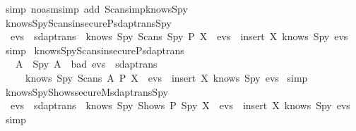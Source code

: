 \begin{isabellebody}
  \isatagproof
  \isamarkupfalse%
  \ {\isacharparenleft}simp\ {\isacharparenleft}no{\isacharunderscore}asm{\isacharunderscore}simp{\isacharparenright}\ add{\isacharcolon}\ Scans{\isacharunderscore}imp{\isacharunderscore}knows{\isacharunderscore}Spy{\isacharparenright}\isanewline
  \isamarkupfalse%
  \endisatagproof
  {\isafoldproof}%
  \isadelimproof
  \isanewline
  \endisadelimproof
  \isanewline
  \isamarkupfalse%
  \ knows{\isacharunderscore}Spy{\isacharunderscore}Scans{\isacharunderscore}insecureP{\isacharunderscore}sdaptrans{\isacharunderscore}Spy\ {\isacharcolon}\isanewline
  \ \ {\isachardoublequoteopen}evs\ {\isasymin}\ sdaptrans\ {\isasymLongrightarrow}\ knows\ Spy\ {\isacharparenleft}Scans\ Spy\ P\ X\ {\isacharhash}\ evs{\isacharparenright}\ {\isacharequal}\ insert\ X\ {\isacharparenleft}knows\ Spy\ evs{\isacharparenright}{\isachardoublequoteclose}\isanewline
  \isadelimproof
  \endisadelimproof
  \isatagproof
  \isamarkupfalse%
  \ simp%
  \endisatagproof
  {\isafoldproof}%
  \isadelimproof
  \isanewline
  \endisadelimproof
  \isanewline
  \isamarkupfalse%
  \ knows{\isacharunderscore}Spy{\isacharunderscore}Scans{\isacharunderscore}insecureP{\isacharunderscore}sdaptrans\ {\isacharcolon}\isanewline
  \ \ {\isachardoublequoteopen}{\isasymlbrakk}\ A\ {\isasymnoteq}\ Spy{\isacharsemicolon}\ A\ {\isasymin}\ bad{\isacharsemicolon}\ evs\ {\isasymin}\ sdaptrans\ {\isasymrbrakk}\ \isanewline
  \ \ \ \ {\isasymLongrightarrow}\ knows\ Spy\ {\isacharparenleft}Scans\ A\ P\ X\ {\isacharhash}\ evs{\isacharparenright}\ {\isacharequal}\ insert\ X\ {\isacharparenleft}knows\ Spy\ evs{\isacharparenright}{\isachardoublequoteclose}\isanewline
  \isadelimproof
  \endisadelimproof
  \isatagproof
  \isamarkupfalse%
  \ simp%
  \endisatagproof
  {\isafoldproof}%
  \isadelimproof
  \isanewline
  \endisadelimproof
  \isanewline
  \isamarkupfalse%
  \ knows{\isacharunderscore}Spy{\isacharunderscore}Shows{\isacharunderscore}secureM{\isacharunderscore}sdaptrans{\isacharunderscore}Spy\ {\isacharcolon}\isanewline
  \ \ {\isachardoublequoteopen}evs\ {\isasymin}\ sdaptrans\ {\isasymLongrightarrow}\ knows\ Spy\ {\isacharparenleft}Shows\ P\ Spy\ X\ {\isacharhash}\ evs{\isacharparenright}\ {\isacharequal}\ insert\ X\ {\isacharparenleft}knows\ Spy\ evs{\isacharparenright}{\isachardoublequoteclose}\isanewline
  \isadelimproof
  \endisadelimproof
  \isatagproof
  \isamarkupfalse%
  \ simp%

\end{isabellebody}
